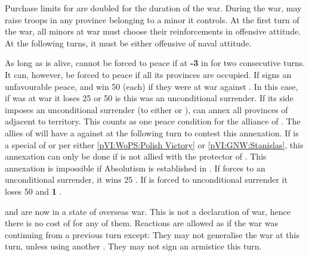 \phadm
\aparag Purchase limits for \PRU are doubled for the duration of the war.
\bparag During the war, \PRU may raise troops in any province belonging to a
minor it controls.
\aparag At the first turn of the war, all minors at war must choose their
reinforcements in offensive attitude.
\bparag At the following turns, it must be either offensive of naval attitude.

\phpaix
\aparag As long as  is alive, \PRU cannot be forced to
peace if at {\bf -3} in \STAB for two consecutive turns.
\bparag It can, however, be forced to peace if all its provinces are occupied.
\aparag If \PRU signs an unfavourable peace, \FRA and \AUS win 50 \VP (each)
if they were at war against \PRU.
\bparag In this case, if \ENG was at war it loses 25 \VP or 50 \VP is this was
an unconditional surrender.
\aparag If its side imposes an unconditional surrender (to either \PRU or
\AUS), \RUS can annex all provinces of \payspologne adjacent to \RUS
territory.
\bparag This counts as one peace condition for the alliance of \RUS.
\bparag The allies of \RUS will have a \CB against \RUS at the following turn
to contest this annexation.
\bparag If \payspologne is a special \EG of \FRA or \SUE per either
\ref{pVI:WoPS:Polish Victory} or \ref{pVI:GNW:Stanislas}, this annexation can
only be done if \RUS is not allied with the protector of \payspologne.
\bparag This annexation is impossible if Absolutism is established in
\payspologne.
\aparag If \PRU forces \paysSaxe to an unconditional surrender, it wins 25
\VP.
\aparag If \AUS is forced to unconditional surrender it loses 50 \VP and {\bf
  1} \STAB.



\phevnt
\aparag \FRA and \ENG are now in a state of overseas war.
\bparag This is not a declaration of war, hence there is no cost of \STAB for
any of them.
\aparag Reactions are allowed as if the war was continuing from a previous
turn except:
\bparag They may not generalise the war at this turn, unless using another
\CB.
\bparag They may not sign an armistice this turn.




